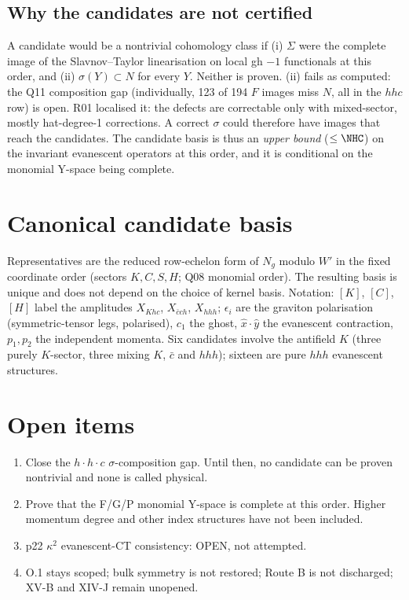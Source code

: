 \documentclass[11pt]{article}
\begin{document}
\subsection{Why the candidates are not certified}
A candidate would be a nontrivial cohomology class if (i) $\Sigma$ were the complete image of the Slavnov--Taylor
linearisation on local gh $-1$ functionals at this order, and (ii) $\sigma(Y)\subset N$ for every $Y$. Neither is proven.
(ii) fails as computed: the Q11 composition gap (individually, 123 of 194 $F$ images miss $N$, all in the $hhc$ row) is open.
R01 localised it: the defects are correctable only with mixed-sector, mostly hat-degree-1 corrections. A correct
$\sigma$ could therefore have images that reach the candidates. The candidate basis is thus an \emph{upper bound}
($\le\NHC$) on the invariant evanescent operators at this order, and it is conditional on the monomial Y-space being
complete.

\section{Canonical candidate basis}
Representatives are the reduced row-echelon form of $N_g$ modulo $W'$ in the fixed coordinate order (sectors $K,C,S,H$;
Q08 monomial order). The resulting basis is unique and does not depend on the choice of kernel basis.
Notation: $[K]$, $[C]$, $[H]$ label the amplitudes $X_{Khc}$, $X_{\bar c ch}$, $X_{hhh}$; $\epsilon_i$ are the graviton
polarisation (symmetric-tensor legs, polarised), $c_1$ the ghost, $\hat x\cdot\hat y$ the evanescent contraction, $p_1,p_2$ the independent momenta.
Six candidates involve the antifield $K$ (three purely $K$-sector, three mixing $K$, $\bar c$ and $hhh$); sixteen are pure $hhh$
evanescent structures.


\section{Open items}
\begin{enumerate}
\item Close the $h\cdot h\cdot c$ $\sigma$-composition gap. Until then, no candidate can be proven nontrivial and none is called physical.
\item Prove that the F/G/P monomial Y-space is complete at this order. Higher momentum degree and other index structures have not been included.
\item p22 $\kappa^2$ evanescent-CT consistency: OPEN, not attempted.
\item O.1 stays scoped; bulk symmetry is not restored; Route B is not discharged; XV-B and XIV-J remain unopened.
\end{enumerate}
\end{document}
